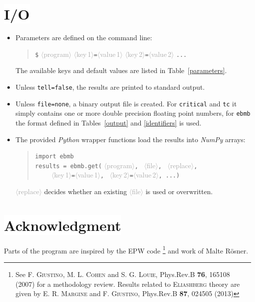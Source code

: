 \documentclass[a4paper]{article}
\def\dummy#1{\textcolor{darkgray}{$\langle$#1$\rangle$}}
\def\headline#1{\section*{%
   \normalsize\normalfont%
   \rlap{\rule[0.5ex]\textwidth{0.4pt}}%
   \qquad\colorbox{white}{#1}%
   }}
\begin{document}
   \headline{I/O}

   \begin{itemize}
      \item
         Parameters are defined on the command line:
         \begin{quote}
            \verb|$| \dummy{program}
               \dummy{key\,1}\verb|=|\dummy{value\,1}
               \dummy{key\,2}\verb|=|\dummy{value\,2} \verb|...|
         \end{quote}
         The available keys and default values are listed in
         Table~\ref{parameters}.

      \item
         Unless \texttt{tell=false}, the results are printed to standard output.

      \item
         Unless \texttt{file=none}, a binary output file is created. For
         \texttt{critical} and \texttt{tc} it simply contains one or more double
         precision floating point numbers, for \texttt{ebmb} the format defined
         in Tables~\ref{output} and \ref{identifiers} is used.

      \item
         The provided \emph{Python} wrapper functions load the results into
         \emph{NumPy} arrays:
         \begin{quote}
            \verb|import ebmb| \\
            \verb|results = ebmb.get(|%
            \dummy{program}\verb|, |%
            \dummy{file}\verb|, |%
            \dummy{replace}\verb|,| \\
            \verb|    |%
               \dummy{key\,1}\verb|=|\dummy{value\,1}\verb|, |%
               \dummy{key\,2}\verb|=|\dummy{value\,2}\verb|, ...|\verb|)|
         \end{quote}
         \dummy{replace} decides whether an existing \dummy{file} is used or
         overwritten.
   \end{itemize}

   \headline{Acknowledgment}

   Parts of the program are inspired by the EPW code%
   \footnote{%
      See F. \textsc{Giustino}, M. L. \textsc{Cohen} and S. G. \textsc{Louie},
      Phys.\@  Rev.\@ B \textbf{76}, 165108 (2007) for a methodology review.
      \newline
      Results related to \textsc{Eliashberg} theory are given by E. R.
      \textsc{Margine} and F. \textsc{Giustino}, Phys.\@ Rev.\@ B \textbf{87},
      024505 (2013)
      }
   and work of Malte Rösner.
\end{document}
